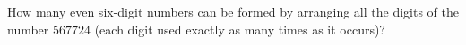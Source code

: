How many even six-digit numbers can be formed by arranging all the digits of the number $567724$ (each digit used exactly as many times as it occurs)?
